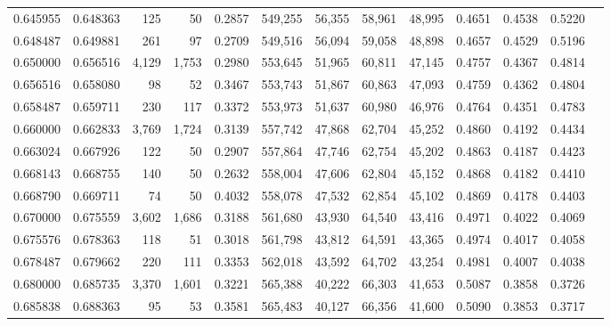 \begin{tabular}{rrrrrrrrrrrrr}
0.645955 & 0.648363 &    125 &    50 &                                     0.2857 & 549,255 &  56,355 &  58,961 &  48,995 & 0.4651 & 0.4538 & 0.5220 \\
0.648487 & 0.649881 &    261 &    97 &                                     0.2709 & 549,516 &  56,094 &  59,058 &  48,898 & 0.4657 & 0.4529 & 0.5196 \\
0.650000 & 0.656516 &  4,129 & 1,753 &                                     0.2980 & 553,645 &  51,965 &  60,811 &  47,145 & 0.4757 & 0.4367 & 0.4814 \\
0.656516 & 0.658080 &     98 &    52 &                                     0.3467 & 553,743 &  51,867 &  60,863 &  47,093 & 0.4759 & 0.4362 & 0.4804 \\
0.658487 & 0.659711 &    230 &   117 &                                     0.3372 & 553,973 &  51,637 &  60,980 &  46,976 & 0.4764 & 0.4351 & 0.4783 \\
0.660000 & 0.662833 &  3,769 & 1,724 &                                     0.3139 & 557,742 &  47,868 &  62,704 &  45,252 & 0.4860 & 0.4192 & 0.4434 \\
0.663024 & 0.667926 &    122 &    50 &                                     0.2907 & 557,864 &  47,746 &  62,754 &  45,202 & 0.4863 & 0.4187 & 0.4423 \\
0.668143 & 0.668755 &    140 &    50 &                                     0.2632 & 558,004 &  47,606 &  62,804 &  45,152 & 0.4868 & 0.4182 & 0.4410 \\
0.668790 & 0.669711 &     74 &    50 &                                     0.4032 & 558,078 &  47,532 &  62,854 &  45,102 & 0.4869 & 0.4178 & 0.4403 \\
0.670000 & 0.675559 &  3,602 & 1,686 &                                     0.3188 & 561,680 &  43,930 &  64,540 &  43,416 & 0.4971 & 0.4022 & 0.4069 \\
0.675576 & 0.678363 &    118 &    51 &                                     0.3018 & 561,798 &  43,812 &  64,591 &  43,365 & 0.4974 & 0.4017 & 0.4058 \\
0.678487 & 0.679662 &    220 &   111 &                                     0.3353 & 562,018 &  43,592 &  64,702 &  43,254 & 0.4981 & 0.4007 & 0.4038 \\
0.680000 & 0.685735 &  3,370 & 1,601 &                                     0.3221 & 565,388 &  40,222 &  66,303 &  41,653 & 0.5087 & 0.3858 & 0.3726 \\
0.685838 & 0.688363 &     95 &    53 &                                     0.3581 & 565,483 &  40,127 &  66,356 &  41,600 & 0.5090 & 0.3853 & 0.3717 \\

\end{tabular}
